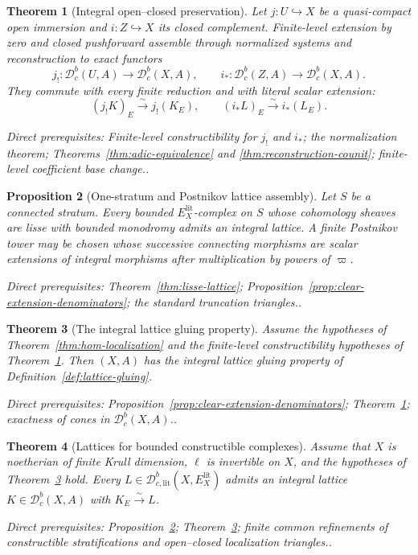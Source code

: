 \documentclass[10pt]{article}
\newtheorem{theorem}{Theorem}[section]
\newtheorem{proposition}[theorem]{Proposition}
\theoremstyle{definition}
\newcommand{\Dbc}{\mathcal D^b_c}
\newcommand{\Dbclit}{\mathcal D^b_{c,\mathrm{lit}}}
\newcommand{\depends}[1]{\par\smallskip\noindent\textit{Direct prerequisites:} #1.}
\begin{document}
\begin{theorem}[Integral open--closed preservation]
\label{thm:integral-open-closed}
Let $j:U\hookrightarrow X$ be a quasi-compact open immersion and
$i:Z\hookrightarrow X$ its closed complement.  Finite-level extension by
zero and closed pushforward assemble through normalized systems and
reconstruction to exact functors
\[
 j_!:\Dbc(U,A)\longrightarrow\Dbc(X,A),
 \qquad
 i_*:\Dbc(Z,A)\longrightarrow\Dbc(X,A).
\]
They commute with every finite reduction and with literal scalar extension:
\[
 (j_!K)_E\xrightarrow{\sim}j_!(K_E),
 \qquad
 (i_*L)_E\xrightarrow{\sim}i_*(L_E).
\]
\depends{Finite-level constructibility for $j_!$ and $i_*$; the
normalization theorem; Theorems~\ref{thm:adic-equivalence} and
\ref{thm:reconstruction-counit}; finite-level coefficient base change.}
\end{theorem}

\begin{proposition}[One-stratum and Postnikov lattice assembly]
\label{prop:postnikov-lattice}
Let $S$ be a connected stratum.  Every bounded
$E_X^{\mathrm{lit}}$-complex on $S$ whose cohomology sheaves are lisse with
bounded monodromy admits an integral lattice.  A finite Postnikov tower may
be chosen whose successive connecting morphisms are scalar extensions of
integral morphisms after multiplication by powers of $\varpi$.
\depends{Theorem~\ref{thm:lisse-lattice};
Proposition~\ref{prop:clear-extension-denominators}; the standard
truncation triangles.}
\end{proposition}

\begin{theorem}[The integral lattice gluing property]
\label{thm:lattice-gluing}
Assume the hypotheses of Theorem~\ref{thm:hom-localization} and the
finite-level constructibility hypotheses of
Theorem~\ref{thm:integral-open-closed}.  Then $(X,A)$ has the integral
lattice gluing property of Definition~\ref{def:lattice-gluing}.
\depends{Proposition~\ref{prop:clear-extension-denominators};
Theorem~\ref{thm:integral-open-closed}; exactness of cones in
$\Dbc(X,A)$.}
\end{theorem}

\begin{theorem}[Lattices for bounded constructible complexes]
\label{thm:complex-lattice}
Assume that $X$ is noetherian of finite Krull dimension, $\ell$ is
invertible on $X$, and the hypotheses of
Theorem~\ref{thm:lattice-gluing} hold.  Every
$L\in\Dbclit(X,E_X^{\mathrm{lit}})$ admits an integral lattice
$K\in\Dbc(X,A)$ with $K_E\xrightarrow{\sim}L$.
\depends{Proposition~\ref{prop:postnikov-lattice};
Theorem~\ref{thm:lattice-gluing}; finite common refinements of
constructible stratifications and open--closed localization triangles.}
\end{theorem}
\end{document}
